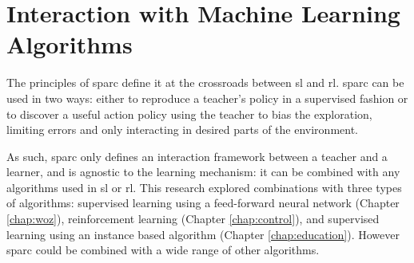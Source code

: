 

\section{Interaction with Machine Learning Algorithms}

The principles of \gls{sparc} define it at the crossroads between \gls{sl} and \gls{rl}. \gls{sparc} can be used in two ways: either to reproduce a teacher's policy in a supervised fashion or to discover a useful action policy using the teacher to bias the exploration, limiting errors and only interacting in desired parts of the environment.

As such, \gls{sparc} only defines an interaction framework between a teacher and a learner, and is agnostic to the learning mechanism: it can be combined with any algorithms used in \gls{sl} or \gls{rl}. This research explored combinations with three types of algorithms: supervised learning using a feed-forward neural network (Chapter \ref{chap:woz}), reinforcement learning (Chapter \ref{chap:control}), and supervised learning using an instance based algorithm (Chapter \ref{chap:education}). However \gls{sparc} could be combined with a wide range of other algorithms.


